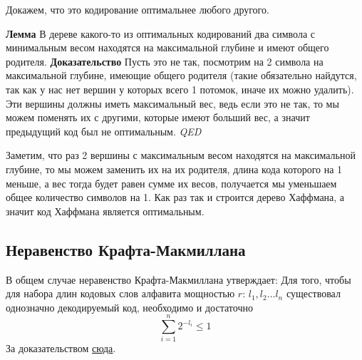 Докажем, что это кодирование оптимальнее любого другого. 

\textbf{Лемма} В дереве какого-то из оптимальных кодирований два символа с минимальным весом находятся на максимальной глубине и имеют общего родителя.
\textbf{Доказательство} Пусть это не так, посмотрим на 2 символа на максимальной глубине, имеющие общего родителя (такие обязательно найдутся, так как у нас нет вершин у которых всего 1 потомок, иначе их можно удалить). Эти вершины должны иметь максимальный вес, ведь если это не так, то мы можем поменять их с другими, которые имеют больший вес, а значит предыдущий код был не оптимальным. \textit{QED}

Заметим, что раз 2 вершины с максимальным весом находятся на максимальной глубине, то мы можем заменить их на их родителя, длина кода которого на 1 меньше, а вес тогда будет равен сумме их весов, получается мы уменьшаем общее количество символов на 1. Как раз так и строится дерево Хаффмана, а значит код Хаффмана является оптимальным.
\subsection{Неравенство Крафта-Макмиллана}
В общем случае неравенство Крафта-Макмиллана утверждает: 
Для того, чтобы для набора длин кодовых слов алфавита мощностью $r$: $l_1, l_2 \dots l_n$ существовал однозначно декодируемый код, необходимо и достаточно $$\sum\limits_{i=1}^n2^{-l_i}\leq 1$$
За доказательством \href{https://neerc.ifmo.ru/wiki/index.php?title=%D0%9D%D0%B5%D1%80%D0%B0%D0%B2%D0%B5%D0%BD%D1%81%D1%82%D0%B2%D0%BE_%D0%9C%D0%B0%D0%BA%D0%BC%D0%B8%D0%BB%D0%BB%D0%B0%D0%BD%D0%B0}{сюда}.
\